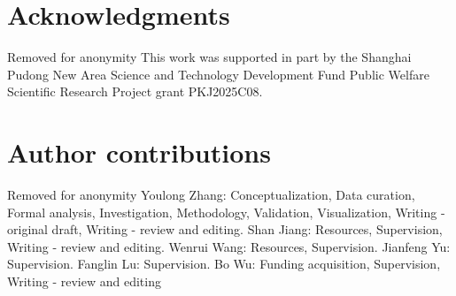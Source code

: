 \documentclass{article}
\makeatletter
\newcommand{\ack}[1]{
	\section*{Acknowledgments}
	\if@anonymous Removed for anonymity \else #1 \fi}
\newcommand{\roles}[1]{
	\section*{Author contributions}
	\if@anonymous Removed for anonymity \else #1 \fi}
\makeatother
\begin{document}
	
	\ack{This work was supported in part by the Shanghai Pudong New Area Science and Technology Development Fund Public Welfare Scientific Research Project grant PKJ2025C08.}
	
	\roles{Youlong Zhang: Conceptualization, Data curation, Formal analysis, Investigation, Methodology, Validation, Visualization, Writing - original draft, Writing - review and editing. Shan Jiang: Resources, Supervision, Writing - review and editing. Wenrui Wang: Resources, Supervision. Jianfeng Yu: Supervision. Fanglin Lu: Supervision. Bo Wu: Funding acquisition, Supervision, Writing - review and editing}
	
	
	
	
	
\end{document}
